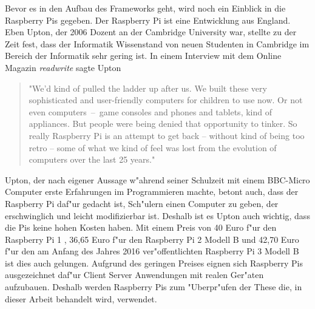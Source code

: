 Bevor es in den Aufbau des Frameworks geht, wird noch ein Einblick in die Raspberry Pis gegeben. %
Der Raspberry Pi ist eine Entwicklung aus England. Eben Upton, der 2006 Dozent an der Cambridge University %
war, stellte zu der Zeit fest, dass der Informatik Wissenstand von neuen Studenten in Cambridge im Bereich der Informatik %
sehr gering ist. 
\newpage In einem Interview mit dem Online Magazin \emph{readwrite} sagte Upton\autocite{web:readWrite} \begin{quotation}"We'd kind of pulled the ladder %
up after us. We built these very sophisticated and user-friendly computers for children to use now. Or not %
even \mbox{computers -- game} consoles and phones and tablets, kind of appliances. But people were being denied that %
opportunity to tinker. So really Raspberry Pi is an attempt to get back -- without kind of being too retro -- some %
of what we kind of feel was lost from the evolution of computers over the last 25 years."\end{quotation} %
Upton, der nach eigener Aussage w"ahrend seiner Schulzeit mit einem BBC-Micro Computer erste Erfahrungen im Programmieren %
machte, betont auch, dass der Raspberry Pi daf"ur gedacht ist, Sch"ulern einen Computer zu geben, der erschwinglich und leicht modifizierbar ist. %
Deshalb ist es Upton auch wichtig, dass die Pis keine hohen Kosten haben. Mit einem Preis von 40 Euro f"ur den Raspberry Pi 1 %
\autocite{amazon:pi1}, 36,65 Euro f"ur den Raspberry Pi 2 Modell B \autocite{amazon:pi2} und 42,70 Euro f"ur den %
am Anfang des Jahres 2016 ver"offentlichten Raspberry Pi 3 Modell B \autocite{amazon:pi3} ist dies auch gelungen. %
Aufgrund des geringen Preises eignen sich Raspberry Pis ausgezeichnet daf"ur Client Server Anwendungen mit realen Ger"aten %
aufzubauen. Deshalb werden Raspberry Pis zum "Uberpr"ufen der These die, in dieser Arbeit behandelt wird, verwendet. %

